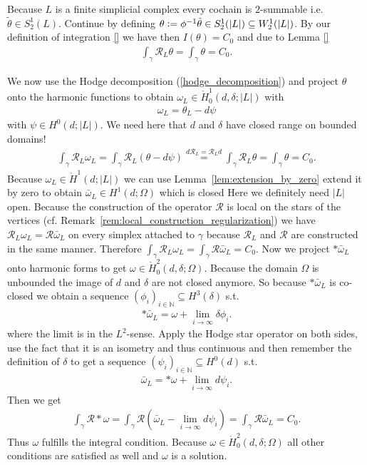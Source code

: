 \documentclass[12pt,a4paper]{article}
\numberwithin{equation}{subsection}
\numberwithin{lemma}{subsection}
\theoremstyle{definition}
\newcommand{\naturalnum}{\mathbb{N}}
\newcommand{\rop}{\mathscr{R}} %
\begin{document}
Because $L$ is a finite simplicial complex every cochain is $2$-summable 
i.e. $\tilde{\theta} \in S^1_2(L)$. 
Continue by defining $\theta \vcentcolon= \phi^{-1}\tilde{\theta}
\in S_2^1(|L|) \subseteq W^1_2(|L|)$.
By our definition of integration \ref{}
we have then $I(\theta) = C_0$ and due to Lemma \ref{} 
\begin{align*}
    \int_\gamma \rop_L \theta = \int_\gamma \theta = C_0.
\end{align*} 

We now use the Hodge decomposition
(\ref{hodge_decomposition}) and project $\theta$ onto the harmonic functions 
to obtain $\omega_L \in \mathring{H}^1_0(d,\delta;|L|)$ with 
\begin{align*}
    \omega_L = \theta_L - d\psi
\end{align*}
with $\psi \in H^0(d;|L|)$. {\color{red} We need here that $d$ and $\delta$ 
have closed range on bounded domains!}
\begin{align*}
    \int_\gamma \rop_L \omega_L 
    = \int_\gamma \rop_L (\theta - d\psi) 
    \stackrel{d\rop_L = \rop_L d}{=}\int_\gamma \rop_L \theta 
    = \int_\gamma \theta = C_0.
\end{align*}
Because $\omega_L \in \mathring{H}^1(d;|L|)$ we can use 
Lemma~\ref{lem:extension_by_zero} extend it by zero to 
obtain $\bar{\omega}_L \in H^1(d;\Omega)$ which is closed {\color{red} Here we 
definitely need $|L|$ open.} 
Because the construction of the operator $\rop$ is local on the stars 
of the vertices
(cf. Remark~\ref{rem:local_construction_regularization}) 
we have $\rop_L \omega_L = \rop \bar{\omega}_L$ on 
every simplex attached to $\gamma$ because $\rop_L$ and $\rop$ are constructed
in the same manner. Therefore 
$\int_\gamma \rop_L \omega_L = \int_\gamma \rop \bar{\omega}_L = C_0$. 
Now we project $*\bar{\omega}_L$ onto harmonic forms to get 
$\omega \in \mathring{H}^2_0(d,\delta;\Omega)$. Because the domain $\Omega$
is unbounded the image of $d$ and $\delta$ are not closed anymore. So because 
$*\bar{\omega}_L$ is co-closed we 
obtain a sequence $(\phi_i)_{i \in \naturalnum} \subseteq H^3(\delta)$ s.t.
\begin{align*}
    *\bar{\omega}_L = \omega + \lim\limits_{i \rightarrow \infty}\delta \phi_i.
\end{align*}
where the limit is in the $L^2$-sense. Apply the Hodge star operator on 
both sides, use the fact that it is an isometry and thus continuous and then 
remember the definition of $\delta$ to get a sequence 
$(\psi_i)_{i \in \naturalnum} \subseteq H^0(d)$ s.t.
\begin{align*}
    \bar{\omega}_L = *\omega + \lim\limits_{i \rightarrow \infty}d \psi_i.
\end{align*}
Then we get
\begin{align*}
    \int_\gamma \rop * \omega 
    =\int_\gamma \rop (\bar{\omega}_L - 
    \lim\limits_{i \rightarrow \infty}d \psi_i) = 
    \int_\gamma \rop \bar{\omega}_L = C_0.
\end{align*}
Thus $\omega$ fulfills the integral condition. 
Because $\omega \in \mathring{H}^2_0(d,\delta;\Omega)$ all other conditions 
are satisfied as well and $\omega$ is a solution.
\end{document}
